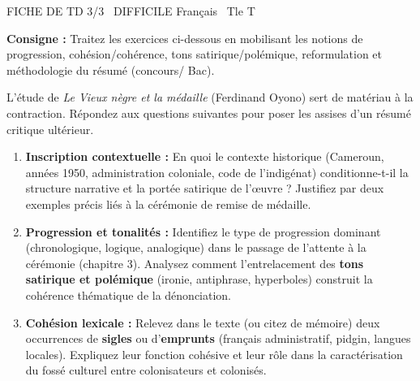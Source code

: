 \documentclass[11pt]{article}
\begin{document}
\begin{tcolorbox}[enhanced,colback=popink,colframe=popink,arc=10pt,boxrule=0pt,left=12pt,right=12pt,top=9pt,bottom=9pt]
{\color{white}\popxbold\small FICHE DE TD 3/3 \textbullet\ DIFFICILE \hfill Français \textbullet\ Tle T\par}
\end{tcolorbox}
\vspace{4pt}
\noindent \textbf{Consigne :} Traitez les exercices ci-dessous en mobilisant les notions de progression, cohésion/cohérence, tons satirique/polémique, reformulation et méthodologie du résumé (concours/ Bac).

\begin{exercice}
L'étude de \textit{Le Vieux nègre et la médaille} (Ferdinand Oyono) sert de matériau à la contraction. Répondez aux questions suivantes pour poser les assises d'un résumé critique ultérieur.
\begin{enumerate}
    \item \textbf{Inscription contextuelle :} En quoi le contexte historique (Cameroun, années 1950, administration coloniale, code de l'indigénat) conditionne-t-il la structure narrative et la portée satirique de l'œuvre ? Justifiez par deux exemples précis liés à la cérémonie de remise de médaille.
    \item \textbf{Progression et tonalités :} Identifiez le type de progression dominant (chronologique, logique, analogique) dans le passage de l'attente à la cérémonie (chapitre 3). Analysez comment l'entrelacement des \textbf{tons satirique et polémique} (ironie, antiphrase, hyperboles) construit la cohérence thématique de la dénonciation.
    \item \textbf{Cohésion lexicale :} Relevez dans le texte (ou citez de mémoire) deux occurrences de \textbf{sigles} ou d'\textbf{emprunts} (français administratif, pidgin, langues locales). Expliquez leur fonction cohésive et leur rôle dans la caractérisation du fossé culturel entre colonisateurs et colonisés.
\end{enumerate}
\end{exercice}
\end{document}
